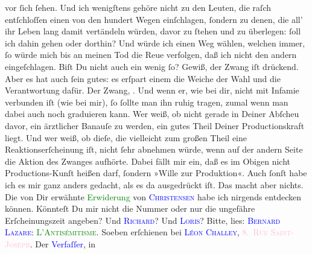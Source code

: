                vor ſich ſehen. Und ich wenigſtens gehöre nicht zu den Leuten, die raſch entſchloſſen
               einen von den hundert Wegen einſchlagen, ſondern zu denen, die all’ ihr Leben lang
               damit vertändeln würden, davor zu ſtehen {\pb}und zu
               überlegen: ſoll ich dahin gehen oder dorthin? Und würde ich einen Weg wählen, welchen
               immer, ſo würde mich bis an meinen Tod die Reue verfolgen, daß ich nicht den andern
               eingeſchlagen. Biſt Du nicht auch ein wenig ſo? Gewiß, der Zwang iſt drückend. Aber
               es hat auch ſein gutes: es erſpart einem die Weiche der Wahl und die Verantwortung
               dafür. Der Zwang, \label{K_L02621-3v}\label{K_L02621-3h}. Und wenn er, wie bei dir, nicht mit Infamie verbunden iſt (wie
               bei mir), ſo ſollte man ihn {\pb}ruhig tragen, zumal
               wenn man dabei auch noch graduieren kann. Wer weiß, ob nicht gerade in Deiner Abſcheu
               davor, ein ärztlicher  Banauſe zu werden, ein
               gutes Theil Deiner Productionskraft liegt. Und wer weiß, ob dieſe, die vielleicht zum
               großen Theil eine Reaktionserſcheinung iſt, nicht ſehr abnehmen würde, wenn auf der
               andern Seite die Aktion des Zwanges aufhörte. Dabei fällt mir ein, daß es im Obigen
               nicht Productions-Kunſt heißen darf, ſondern »Wille zur Produktion«. Auch ſonſt habe
               ich es mir ganz {\pb}anders gedacht, als es da
               ausgedrückt iſt. Das macht aber nichts.\pend
           \pstart
           Die von Dir erwähnte \textcolor{green}{Erwiderung}{} von \textsc{\textcolor{blue}{Christensen}{}\ledrightnote{\textcolor{blue}{Hjalmar Christensen}}} habe ich nirgends entdecken können. Könnteſt Du mir nicht die Nummer oder nur
               die ungefähre Erſcheinungszeit angeben?\pend
           \pstart
           Und \textsc{\textcolor{blue}{Richard}{}\ledrightnote{\textcolor{blue}{Richard Beer-Hofmann}}}? Und \textsc{\textcolor{blue}{Loris}{}\ledrightnote{\textcolor{blue}{Hugo von Hofmannsthal}}}?\pend
           \pstart
           Bitte, lies: \textsc{\textcolor{blue}{Bernard Lazare}{}\ledrightnote{\textcolor{blue}{Bernard Lazare}}}: \textsc{\textcolor{green}{L’Antisémitisme}{}\ledrightnote{\textcolor{green}{L’antisémitisme. Son histoire et ses causes}}}. Soeben erſchienen bei \textsc{\textcolor{blue}{Léon Challey}{}\ledrightnote{\textcolor{blue}{Léon Chailley}}}, \textsc{\textcolor{pink}{8. Rue Saint-Joseph}{}\ledrightnote{\textcolor{pink}{Rue Saint-Joseph}}}. Der \textcolor{blue}{Verfaſſer}{}, in
